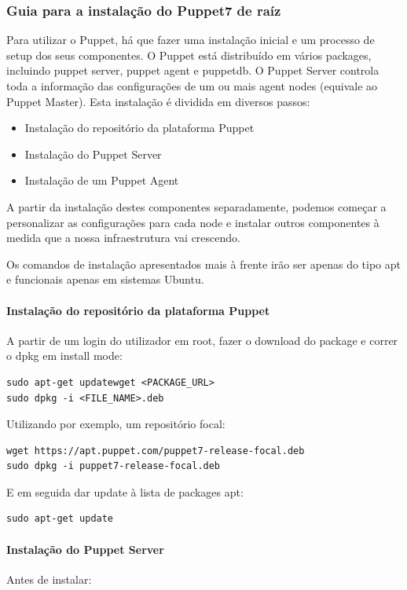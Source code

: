 \documentclass{article}
\begin{document}
\subsubsection{Guia para a instalação do Puppet7 de raíz}
Para utilizar o Puppet, há que fazer uma instalação inicial e um processo de setup dos seus componentes.
O Puppet está distribuído em vários packages, incluindo puppet server, puppet agent e puppetdb. O Puppet Server controla toda a informação das configurações de um ou mais agent nodes (equivale ao Puppet Master).
Esta instalação é dividida em diversos passos:
\begin{itemize}
    \item Instalação do repositório da plataforma Puppet
    \item Instalação do Puppet Server
    \item Instalação de um Puppet Agent
\end{itemize}

A partir da instalação destes componentes separadamente, podemos começar a personalizar as configurações para cada node e instalar outros componentes à medida que a nossa infraestrutura vai crescendo.

Os comandos de instalação apresentados mais à frente irão ser apenas do tipo apt e funcionais apenas em sistemas Ubuntu.

\paragraph{Instalação do repositório da plataforma Puppet}
A partir de um login do utilizador em root, fazer o download do package e correr o dpkg em install mode:
\begin{lstlisting}
sudo apt-get updatewget <PACKAGE_URL>
sudo dpkg -i <FILE_NAME>.deb
\end{lstlisting}

Utilizando por exemplo, um repositório focal:
\begin{lstlisting}
wget https://apt.puppet.com/puppet7-release-focal.deb
sudo dpkg -i puppet7-release-focal.deb
\end{lstlisting}

E em seguida dar update à lista de packages apt:
\begin{lstlisting}
sudo apt-get update
\end{lstlisting}

\paragraph{Instalação do Puppet Server}
Antes de instalar:
\end{document}
